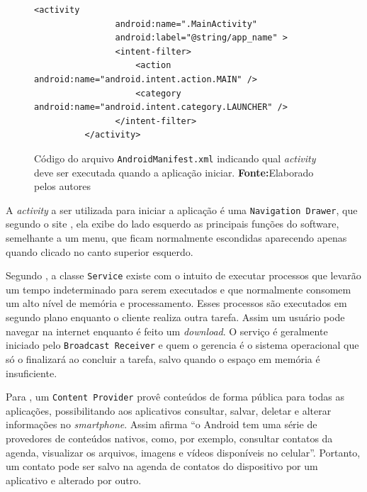 	\begin{figure}[h!]
		\begin{lstlisting}[style=custom_XML]
		  <activity
	            android:name=".MainActivity"
	            android:label="@string/app_name" >
	            <intent-filter>
	                <action android:name="android.intent.action.MAIN" />
	                <category android:name="android.intent.category.LAUNCHER" />
	            </intent-filter>
	      </activity>
		\end{lstlisting}
		\caption[Código do arquivo
		AndroidManifest.xml indicando qual activity deve ser executada quando a
		aplicação iniciar]{Código do arquivo \texttt{AndroidManifest.xml} indicando
		qual \textit{activity} deve ser executada quando a aplicação iniciar.
		 \textbf{Fonte:}Elaborado pelos autores}
		\label{fig:qt2}
	\end{figure}
	
	\par A \textit{activity} a ser utilizada para iniciar a aplicação é uma
\texttt{Navigation Drawer}, que segundo o site , ela exibe
do lado esquerdo as principais funções do software, semelhante a um
menu, que ficam normalmente escondidas aparecendo apenas quando clicado no canto
superior esquerdo. 

	\par Segundo , a classe \texttt{Service} existe com o intuito
de executar processos que levarão um tempo indeterminado para serem executados
e que normalmente consomem um alto nível de memória e processamento. Esses
processos são executados em segundo plano enquanto o cliente realiza outra
tarefa. Assim um usuário pode navegar na internet enquanto é feito um
\textit{download}. O serviço é geralmente iniciado pelo \texttt{Broadcast Receiver} e
quem o gerencia é o sistema operacional que só o finalizará ao concluir a
tarefa, salvo quando o espaço em memória é insuficiente.

	\par Para , um \texttt{Content Provider} provê conteúdos de
forma pública para todas as aplicações, possibilitando aos aplicativos consultar,
salvar, deletar e alterar informações no \textit{smartphone}. Assim afirma
 “o Android tem uma série de provedores de
conteúdos nativos, como, por exemplo, consultar contatos da agenda, visualizar
os arquivos, imagens e vídeos disponíveis no celular”. Portanto, um contato
pode ser salvo na agenda de contatos do dispositivo por um aplicativo e
alterado por outro.

